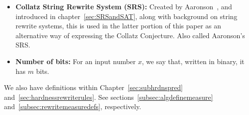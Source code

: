 \begin{itemize}
\begin{itemize}
      \end{itemize}
\item \textbf{Collatz String Rewrite System (SRS):} Created by Aaronson~\cite{HeuleAaronson}, and introduced in chapter~\ref{sec:SRSandSAT}, along with background on string rewrite systems, this is used in the latter portion of this paper as an alternative way of expressing the Collatz Conjecture. Also called Aaronson's SRS.
\item \textbf{Number of bits:} For an input number $x$, we say that, written in binary, it has $m$ bits.
\end{itemize}
We also have definitions within Chapter~\ref{sec:subhrdnspred} and~\ref{sec:hardnessrewriterules}. See sections~\ref{subsec:algdefinemeasure} and~\ref{subsec:rewritemeasuredefs}, respectively.
%
